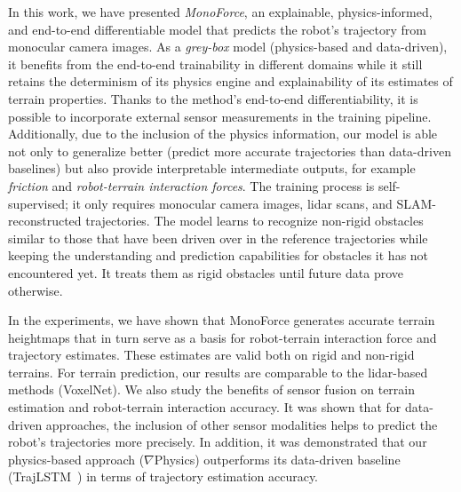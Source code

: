 In this work, we have presented \emph{MonoForce}, an explainable, physics-informed,
and end-to-end differentiable model that predicts the robot's trajectory from monocular camera images.
As a \emph{grey-box} model (physics-based and data-driven), it benefits from the end-to-end trainability
in different domains while it still retains the determinism of its physics engine and explainability
of its estimates of terrain properties.
Thanks to the method's end-to-end differentiability, it is possible to incorporate
external sensor measurements in the training pipeline.
Additionally, due to the inclusion of the physics information, our model is able not only to
generalize better (predict more accurate trajectories than data-driven baselines) but also provide interpretable intermediate outputs, for example
\emph{friction} and \emph{robot-terrain interaction forces}.
The training process is self-supervised; it only requires monocular camera images,
lidar scans, and SLAM-reconstructed trajectories.
The model learns to recognize non-rigid obstacles similar to those that have been driven over in the reference trajectories
while keeping the understanding and prediction capabilities for obstacles it has not encountered yet.
It treats them as rigid obstacles until future data prove otherwise.

In the experiments, we have shown that MonoForce generates accurate terrain heightmaps
that in turn serve as a basis for robot-terrain interaction force and trajectory estimates.
These estimates are valid both on rigid and non-rigid terrains.
For terrain prediction, our results are comparable to the lidar-based methods (VoxelNet).
We also study the benefits of sensor fusion on terrain estimation and robot-terrain interaction accuracy.
It was shown that for data-driven approaches, the inclusion of other sensor modalities helps
to predict the robot's trajectories more precisely.
In addition, it was demonstrated that our physics-based approach
($\nabla$Physics) outperforms  its data-driven baseline (TrajLSTM~\cite{pang2019aircraft})
in terms of trajectory estimation accuracy.
